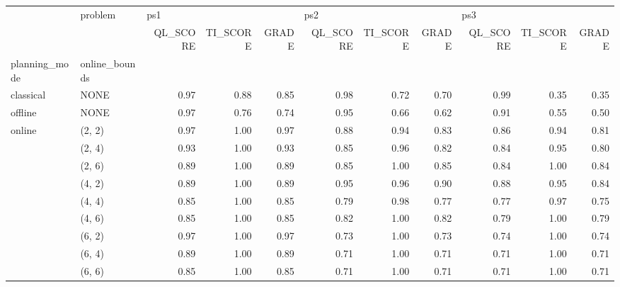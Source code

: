\begin{tabular}{llrrrrrrrrr}
\toprule
       & problem & \multicolumn{3}{l}{ps1} & \multicolumn{3}{l}{ps2} & \multicolumn{3}{l}{ps3} \\
       & {} & QL\_SCORE & TI\_SCORE & GRADE & QL\_SCORE & TI\_SCORE & GRADE & QL\_SCORE & TI\_SCORE & GRADE \\
planning\_mode & online\_bounds &          &          &       &          &          &       &          &          &       \\
\midrule
classical & NONE &     0.97 &     0.88 &  0.85 &     0.98 &     0.72 &  0.70 &     0.99 &     0.35 &  0.35 \\
offline & NONE &     0.97 &     0.76 &  0.74 &     0.95 &     0.66 &  0.62 &     0.91 &     0.55 &  0.50 \\
online & (2, 2) &     0.97 &     1.00 &  0.97 &     0.88 &     0.94 &  0.83 &     0.86 &     0.94 &  0.81 \\
       & (2, 4) &     0.93 &     1.00 &  0.93 &     0.85 &     0.96 &  0.82 &     0.84 &     0.95 &  0.80 \\
       & (2, 6) &     0.89 &     1.00 &  0.89 &     0.85 &     1.00 &  0.85 &     0.84 &     1.00 &  0.84 \\
       & (4, 2) &     0.89 &     1.00 &  0.89 &     0.95 &     0.96 &  0.90 &     0.88 &     0.95 &  0.84 \\
       & (4, 4) &     0.85 &     1.00 &  0.85 &     0.79 &     0.98 &  0.77 &     0.77 &     0.97 &  0.75 \\
       & (4, 6) &     0.85 &     1.00 &  0.85 &     0.82 &     1.00 &  0.82 &     0.79 &     1.00 &  0.79 \\
       & (6, 2) &     0.97 &     1.00 &  0.97 &     0.73 &     1.00 &  0.73 &     0.74 &     1.00 &  0.74 \\
       & (6, 4) &     0.89 &     1.00 &  0.89 &     0.71 &     1.00 &  0.71 &     0.71 &     1.00 &  0.71 \\
       & (6, 6) &     0.85 &     1.00 &  0.85 &     0.71 &     1.00 &  0.71 &     0.71 &     1.00 &  0.71 \\
\bottomrule
\end{tabular}
